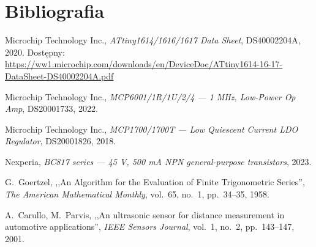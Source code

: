 \documentclass[a4paper,11pt]{article}
\begin{document}
	\section*{Bibliografia}
	
	\begin{enumerate}[label={[\arabic*]}, nosep]
		\item Microchip Technology Inc., \textit{ATtiny1614/1616/1617 Data Sheet},
		DS40002204A, 2020. Dostępny:
		\url{https://ww1.microchip.com/downloads/en/DeviceDoc/ATtiny1614-16-17-DataSheet-DS40002204A.pdf}
		\item Microchip Technology Inc., \textit{MCP6001/1R/1U/2/4 --- 1 MHz, Low-Power
			Op Amp}, DS20001733, 2022.
		\item Microchip Technology Inc., \textit{MCP1700/1700T --- Low Quiescent Current
			LDO Regulator}, DS20001826, 2018.
		\item Nexperia, \textit{BC817 series --- 45 V, 500 mA NPN general-purpose transistors},
		2023.
		\item G.~Goertzel, ,,An Algorithm for the Evaluation of Finite Trigonometric Series'',
		\textit{The American Mathematical Monthly}, vol.~65, no.~1, pp.~34--35, 1958.
		\item A.~Carullo, M.~Parvis, ,,An ultrasonic sensor for distance measurement
		in automotive applications'', \textit{IEEE Sensors Journal}, vol.~1, no.~2,
		pp.~143--147, 2001.
	\end{enumerate}
	
\end{document}
